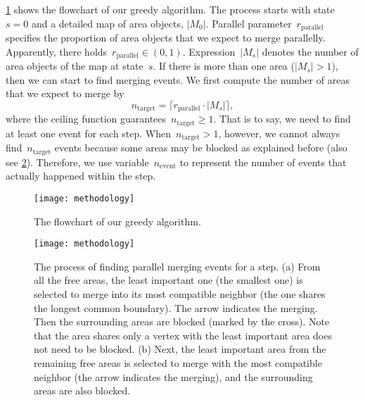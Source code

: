 \documentclass[ijgi,article,submit,moreauthors,pdftex]{Definitions/mdpi}
\begin{document}
\fig\ref{fig:greedy_framework} shows the flowchart of our greedy algorithm.
The process starts with state~$s=0$ and a detailed map of area objects, $|M_0|$.
Parallel parameter~$r_\mathrm{parallel}$ specifies 
the proportion of area objects that
we expect to merge parallelly.
Apparently, there holds~$r_\mathrm{parallel} \in (0,1)$.
Expression~$|M_s|$ denotes the number of area objects of the map at state~$s$.
If there is more than one area ($|M_s|>1$),
then we can start to find merging events.
We first compute the number of areas that we expect to merge by
\begin{equation}
\label{eq:n_target}
n_\mathrm{target} =
\lceil r_\mathrm{parallel} \cdot |M_s| \rceil,
\end{equation}
where the ceiling function guarantees~$n_\mathrm{target}\ge 1$.
That is to say, we need to find at least one event for each step.
When~$n_\mathrm{target} > 1$, however,
we cannot always find~$n_\mathrm{target}$ events
because some areas may be blocked as explained before
(also see \fig\ref{fig:blocked_polygons}).
Therefore, we use variable~$n_\mathrm{event}$
to represent the number of events that actually happened within the step. 


\begin{figure}[tb]
\centering
\texttt{[image: methodology]}
\caption{The flowchart of our greedy algorithm.
}
\label{fig:greedy_framework}
\end{figure}


\begin{figure}[tb]
\centering
\texttt{[image: methodology]}
\caption{The process of finding parallel merging events for a step.
    (a) From all the free areas,
	the least important one (the smallest one) is selected to merge into
	its most compatible neighbor (the one shares the longest common boundary).
    The arrow indicates the merging.
	Then the surrounding areas are blocked (marked by the cross).
    Note that the area shares only a vertex with the least important area 
    does not need to be blocked.
	(b) Next, the least important area from the remaining free areas
	is selected to merge with the most compatible neighbor
	(the arrow indicates the merging),
	and the surrounding areas are also blocked.
}
\label{fig:blocked_polygons}
\end{figure}
\end{document}
